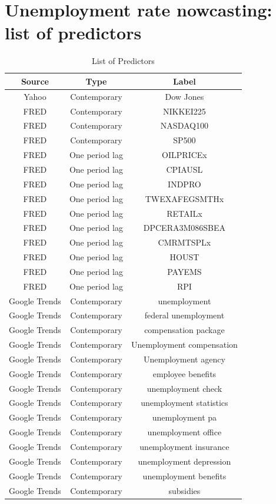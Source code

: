 \documentclass[
  12pt,
]{book}
\theoremstyle{break}
\theoremstyle{nonumberplain}
\begin{document}
\newpage
\section{\small Unemployment rate nowcasting: list of predictors}

\begin{table}[H]

\caption{\label{tab:mytab101}List of Predictors}
\centering
\fontsize{8}{10}\selectfont
\begin{tabular}[t]{ccc}
\toprule
Source & Type & Label\\
\midrule
Yahoo & Contemporary & Dow Jones\\
FRED & Contemporary & NIKKEI225\\
FRED & Contemporary & NASDAQ100\\
FRED & Contemporary & SP500\\
FRED & One period lag & OILPRICEx\\
\addlinespace
FRED & One period lag & CPIAUSL\\
FRED & One period lag & INDPRO\\
FRED & One period lag & TWEXAFEGSMTHx\\
FRED & One period lag & RETAILx\\
FRED & One period lag & DPCERA3M086SBEA\\
\addlinespace
FRED & One period lag & CMRMTSPLx\\
FRED & One period lag & HOUST\\
FRED & One period lag & PAYEMS\\
FRED & One period lag & RPI\\
Google Trends & Contemporary & unemployment\\
\addlinespace
Google Trends & Contemporary & federal unemployment\\
Google Trends & Contemporary & compensation package\\
Google Trends & Contemporary & Unemployment compensation\\
Google Trends & Contemporary & Unemployment agency\\
Google Trends & Contemporary & employee benefits\\
\addlinespace
Google Trends & Contemporary & unemployment check\\
Google Trends & Contemporary & unemployment statistics\\
Google Trends & Contemporary & unemployment pa\\
Google Trends & Contemporary & unemployment office\\
Google Trends & Contemporary & unemployment insurance\\
\addlinespace
Google Trends & Contemporary & unemployment depression\\
Google Trends & Contemporary & unemployment benefits\\
Google Trends & Contemporary & subsidies\\
\bottomrule
\end{tabular}
\end{table}
\end{document}

